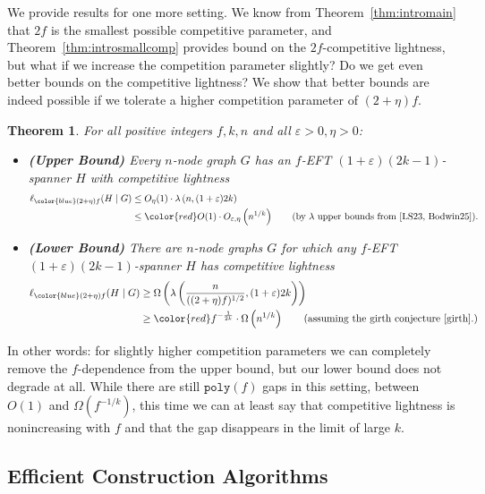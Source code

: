 \documentclass{article}
\theoremstyle{plain}
\newtheorem{theorem}{Theorem}
\theoremstyle{definition}
\newcommand{\eps}{\varepsilon}
\begin{document}
We provide results for one more setting.  We know from Theorem~\ref{thm:intromain} that $2f$ is the smallest possible competitive parameter, and Theorem~\ref{thm:introsmallcomp} provides bound on the $2f$-competitive lightness, but what if we increase the competition parameter slightly?  Do we get even better bounds on the competitive lightness?  We show that better bounds are indeed possible if we tolerate a higher competition parameter of $(2+\eta)f$.
\begin{theorem} \label{thm:introbigcomp}
For all positive integers $f, k, n$ and all $\eps > 0, \eta > 0$:
\begin{itemize}
\item \textbf{(Upper Bound)} Every $n$-node graph $G$ has an $f$-EFT $(1+\eps)(2k-1)$-spanner $H$ with competitive lightness
     \begin{align*}
     \ell_{\color{blue} (2 + \eta)f}(H \mid G) &\le { O_{\eta}(1)} \cdot \lambda\left( n, (1+\eps)2k\right)\\
                         &\le {\color{red} O(1)} \cdot O_{\eps, \eta}\left(n^{1/k}\right) \tag{by $\lambda$ upper bounds from \cite{LS23, Bodwin25}}.
     \end{align*}

\item \textbf{(Lower Bound)} There are $n$-node graphs $G$ for which any $f$-EFT $(1+\eps)(2k-1)$-spanner $H$ has competitive lightness
     \begin{align*}
     \ell_{\color{blue} (2+\eta)f}(H \mid G) &\ge \Omega\left(\lambda\left(\frac{n}{((2+\eta)f)^{1/2}}, (1+\eps)2k\right)\right)\\
                         &\ge {\color{red} f^{-\frac{1}{2k}}} \cdot \Omega\left(n^{1/k}\right) \tag{assuming the girth conjecture \cite{girth}.}
     \end{align*}
\end{itemize}
\end{theorem}

In other words: for slightly higher competition parameters we can completely remove the $f$-dependence from the upper bound, but our lower bound does not degrade at all.
While there are still $\texttt{poly}(f)$ gaps in this setting, between $O(1)$ and $\Omega(f^{-1/k})$, this time we can at least say that competitive lightness is nonincreasing with $f$ and that the gap disappears in the limit of large $k$.

\subsection{Efficient Construction Algorithms}
\end{document}

